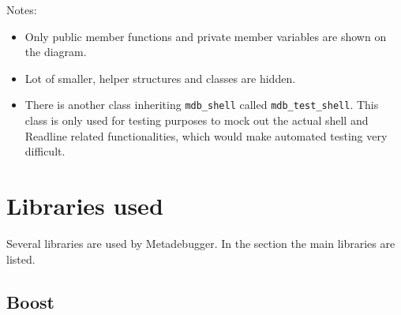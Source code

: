 \noindent
Notes:
\begin{itemize}
    \item
        Only public member functions and private member variables are shown
        on the diagram.
    \item
        Lot of smaller, helper structures and classes are hidden.
    \item
        There is another class inheriting \texttt{mdb\_shell} called
        \texttt{mdb\_test\_shell}. This class is only used for testing
        purposes to mock out the actual shell and Readline related
        functionalities, which would make automated testing very difficult.
\end{itemize}

\section{Libraries used}

Several libraries are used by Metadebugger. In the section the main libraries
are listed.

\subsection{Boost\cite{boost}}

